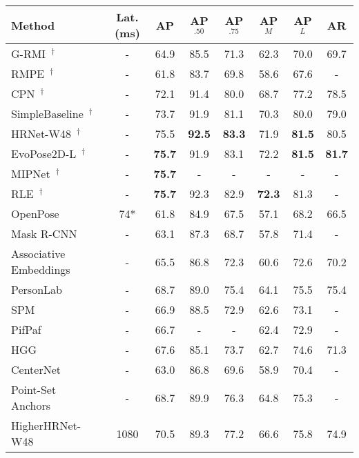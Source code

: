 \documentclass[runningheads]{llncs}
\newcommand\hll[1]{\bgroup
  \hskip0pt\color{black}#1\egroup
}
\begin{document}
\begin{table}[t!]
\centering
\begin{tabular}{l|c|c|c|c|c|c|c}
	\hline
	Method & \hll{Lat. (ms)} & AP & AP$^{.50}$ & AP$^{.75}$ & AP$^M$ & AP$^L$ & AR\\
	\hline
	\hll{G-RMI~\cite{papandreou2017towards}$^\dagger$} & - & 64.9 & 85.5 & 71.3 & 62.3 & 70.0 & 69.7 \\
	\hll{RMPE~\cite{fang2017rmpe}$^\dagger$} & - & 61.8 & 83.7 & 69.8 & 58.6 & 67.6 & -\\
	CPN~\cite{chen2018cascaded}$^\dagger$ & - & 72.1 & 91.4 & 80.0 & 68.7 & 77.2 & 78.5 \\
	SimpleBaseline~\cite{xiao2018simple}$^\dagger$ & - & 73.7 & 91.9 & 81.1 & 70.3 & 80.0 & 79.0 \\
	HRNet-W48~\cite{sun2019deep}$^\dagger$ & - & 75.5 & \textbf{92.5} & \textbf{83.3} & 71.9 & \textbf{81.5} & 80.5\\
	EvoPose2D-L~\cite{mcnally2021evopose2d}$^\dagger$ & - & \textbf{75.7} & 91.9 & 83.1 & 72.2 & \textbf{81.5} & \textbf{81.7}\\
	MIPNet~\cite{khirodkar2021multi}$^\dagger$ & - & \textbf{75.7} & - & - & - & - & - \\
	RLE~\cite{li2021human}$^\dagger$ & - & \textbf{75.7} & 92.3 & 82.9 & \textbf{72.3} & 81.3 & - \\
	\hline
OpenPose~\cite{cao2017realtime, cao2018openpose} & 74* & 61.8 & 84.9 & 67.5 & 57.1 & 68.2 & 66.5 \\
	Mask R-CNN~\cite{he2017mask} & - & 63.1 & 87.3 & 68.7 & 57.8 & 71.4 & - \\
	Associative Embeddings~\cite{newell2017associative} & - & 65.5 & 86.8 & 72.3 & 60.6 & 72.6 & 70.2\\
	PersonLab~\cite{papandreou2018personlab}  & - & 68.7 & 89.0 & 75.4 & 64.1 & 75.5 & 75.4 \\
	SPM~\cite{nie2019single} & - & 66.9 & 88.5 & 72.9 & 62.6 & 73.1 & - \\
	PifPaf~\cite{kreiss2019pifpaf} & - & 66.7 & - & - & 62.4 & 72.9 & - \\
	\hll{HGG~\cite{jin2020differentiable}} & - & 67.6 & 85.1 & 73.7 & 62.7 & 74.6 & 71.3 \\
	\hll{CenterNet~\cite{zhou2019objects}} & - & 63.0 & 86.8 & 69.6 & 58.9 & 70.4 & - \\
	\hll{Point-Set Anchors~\cite{wei2020point}} & - & 68.7 & 89.9 & 76.3 & 64.8 & 75.3 & - \\
	HigherHRNet-W48~\cite{cheng2020higherhrnet} & 1080 & 70.5 & 89.3 & 77.2 & 66.6 & 75.8 & 74.9\\ 

\end{tabular}
\end{table}
\end{document}
